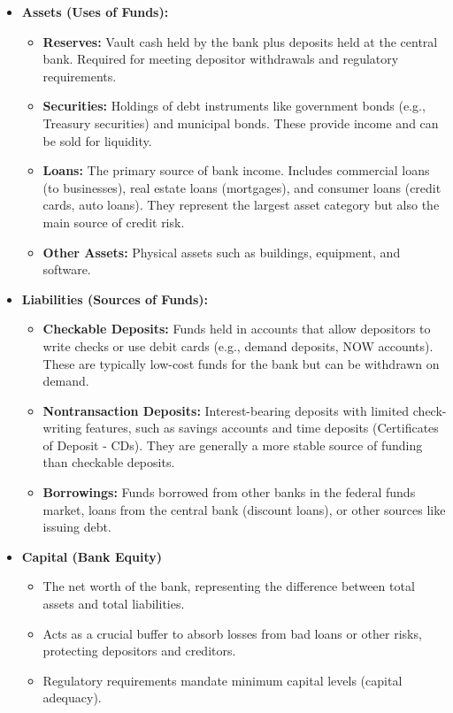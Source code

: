 \begin{itemize}
    \item \textbf{Assets (Uses of Funds):}
    \begin{itemize}
        \item \textbf{Reserves:} Vault cash held by the bank plus deposits held at the central bank. Required for meeting depositor withdrawals and regulatory requirements.
        \item \textbf{Securities:} Holdings of debt instruments like government bonds (e.g., Treasury securities) and municipal bonds. These provide income and can be sold for liquidity.
        \item \textbf{Loans:} The primary source of bank income. Includes commercial loans (to businesses), real estate loans (mortgages), and consumer loans (credit cards, auto loans). They represent the largest asset category but also the main source of credit risk.
        \item \textbf{Other Assets:} Physical assets such as buildings, equipment, and software.
    \end{itemize}
    \item \textbf{Liabilities (Sources of Funds):}
    \begin{itemize}
        \item \textbf{Checkable Deposits:} Funds held in accounts that allow depositors to write checks or use debit cards (e.g., demand deposits, NOW accounts). These are typically low-cost funds for the bank but can be withdrawn on demand.
        \item \textbf{Nontransaction Deposits:} Interest-bearing deposits with limited check-writing features, such as savings accounts and time deposits (Certificates of Deposit - CDs). They are generally a more stable source of funding than checkable deposits.
        \item \textbf{Borrowings:} Funds borrowed from other banks in the federal funds market, loans from the central bank (discount loans), or other sources like issuing debt.
    \end{itemize}
    \item \textbf{Capital (Bank Equity)}
    \begin{itemize}
        \item The net worth of the bank, representing the difference between total assets and total liabilities.
        \item Acts as a crucial buffer to absorb losses from bad loans or other risks, protecting depositors and creditors.
        \item Regulatory requirements mandate minimum capital levels (capital adequacy).
    \end{itemize}
\end{itemize}

